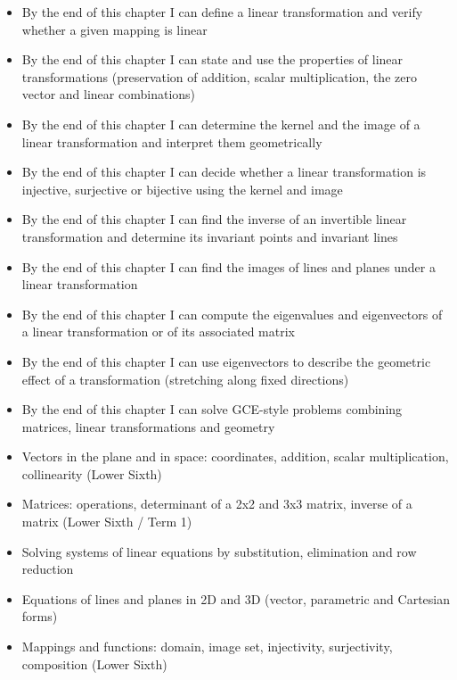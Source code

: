 \documentclass[11pt]{article}
\begin{document}
\begin{objectifs}
\begin{itemize}
\item By the end of this chapter I can define a linear transformation and verify whether a given mapping is linear
\item By the end of this chapter I can state and use the properties of linear transformations (preservation of addition, scalar multiplication, the zero vector and linear combinations)
\item By the end of this chapter I can determine the kernel and the image of a linear transformation and interpret them geometrically
\item By the end of this chapter I can decide whether a linear transformation is injective, surjective or bijective using the kernel and image
\item By the end of this chapter I can find the inverse of an invertible linear transformation and determine its invariant points and invariant lines
\item By the end of this chapter I can find the images of lines and planes under a linear transformation
\item By the end of this chapter I can compute the eigenvalues and eigenvectors of a linear transformation or of its associated matrix
\item By the end of this chapter I can use eigenvectors to describe the geometric effect of a transformation (stretching along fixed directions)
\item By the end of this chapter I can solve GCE-style problems combining matrices, linear transformations and geometry
\end{itemize}
\end{objectifs}

\begin{prerequis}
\begin{itemize}
\item Vectors in the plane and in space: coordinates, addition, scalar multiplication, collinearity (Lower Sixth)
\item Matrices: operations, determinant of a 2x2 and 3x3 matrix, inverse of a matrix (Lower Sixth / Term 1)
\item Solving systems of linear equations by substitution, elimination and row reduction
\item Equations of lines and planes in 2D and 3D (vector, parametric and Cartesian forms)
\item Mappings and functions: domain, image set, injectivity, surjectivity, composition (Lower Sixth)
\end{itemize}
\end{prerequis}
\end{document}
